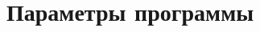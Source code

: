 \chapter{Параметры программы}\label{app:A}
\begin{comment}
	
Выражение \eqref{eq:Young_conjugated} может быть записано как:
%
\begin{multline}
	\begin{bmatrix}
		{\Pi}_1 & 0 \\ 0 & {\Sigma}_2 
	\end{bmatrix}+
	\begin{bmatrix}
		0&-{BK}\\-({BK})\T&0
	\end{bmatrix}+
	\begin{bmatrix}
		{M}_1{F}_1{N}_1{Q}_1 + {Q}_1({M}_1{F}_1{N}_1)\T&0 \\ 0& 0
	\end{bmatrix}
	\\ + \begin{bmatrix}
		0& {Q}_1({S} {M}_1{F}_1{N}_1)\T{P}_2 \\
		{P}_2{M}_1{F}_1{N}_1{Q}_1 - ({BK})\T & 0
	\end{bmatrix}<0,
\end{multline}
%
раскрываем:
%
\begin{multline}
	\label{eq:Young_expand}
	\begin{bmatrix}
		{\Pi}_1 & 0 \\ 0 & {\Sigma}_2 
	\end{bmatrix}+ \begin{bmatrix}
		-{BK} \\ 0
	\end{bmatrix}\begin{bmatrix}
		0 \\ {I}
	\end{bmatrix}\T
	+\begin{bmatrix}
		0 \\ {I} 
	\end{bmatrix}\begin{bmatrix}
		-{BK} \\0
	\end{bmatrix}\T+\begin{bmatrix}
		{Q}_1{N}_1\T \\0
	\end{bmatrix}{F}_1\T\begin{bmatrix}
		{M}_1 \\0
	\end{bmatrix}\T \\ + \begin{bmatrix}

\end{comment}

